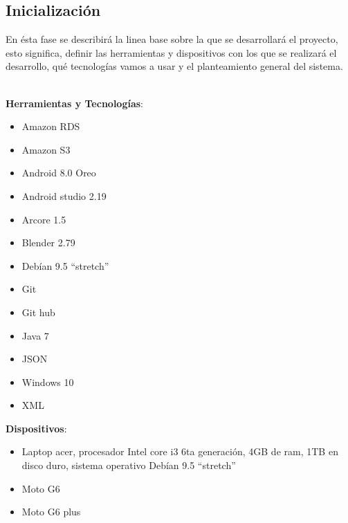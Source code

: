\subsection{Inicialización}
En ésta fase se describirá la linea base sobre la que se desarrollará el proyecto, esto significa, definir las herramientas y dispositivos con los que se realizará el desarrollo, qué tecnologías vamos a usar y el planteamiento general del sistema.\par
\noindent
\\
\textbf{Herramientas y Tecnologías}:
	\begin{itemize}
			\item Amazon RDS
			\item Amazon S3
			\item Android 8.0 Oreo
			\item Android studio 2.19
			\item Arcore 1.5
			\item Blender 2.79
			\item Debían  9.5 “stretch”
			\item Git
			\item Git hub
			\item Java 7
	  		\item JSON
			\item Windows 10
			\item XML		
	\end{itemize}
	\noindent
\textbf{Dispositivos}:
\begin{itemize}
	\item Laptop acer, procesador Intel core i3 6ta generación, 4GB de ram, 1TB en disco duro, sistema operativo Debían  9.5 “stretch”
	\item Moto G6
	\item Moto G6 plus		
\end{itemize}
\noindent

